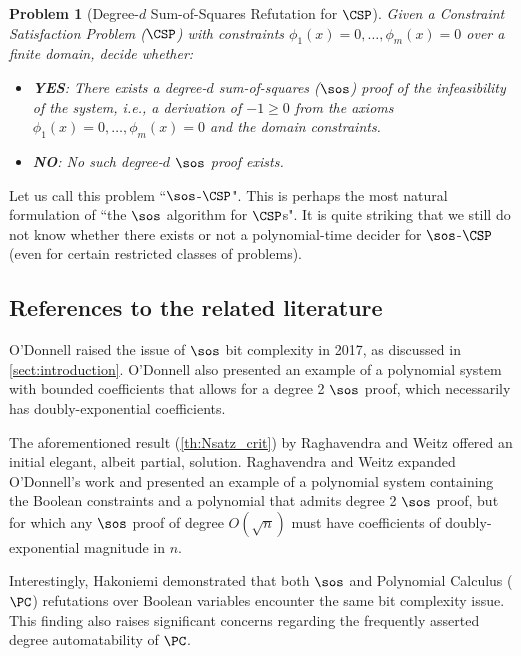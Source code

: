 \documentclass[11pt]{article}
\newtheorem{problem}[theorem]{Problem}
\begin{document}
\begin{problem}[Degree-$d$ Sum-of-Squares Refutation for $\CSP$]\label{prob:sos-csp}
Given a Constraint Satisfaction Problem (\(\CSP\)) with constraints \(\phi_1(x) = 0, \dots, \phi_m(x) = 0\) over a finite domain, decide whether:
\begin{itemize}
    \item \textbf{YES}: There exists a degree-\(d\) sum-of-squares (\(\sos\)) proof of the infeasibility of the system, i.e., a derivation of \(-1 \geq 0\) from the axioms \(\phi_1(x) = 0, \dots, \phi_m(x) = 0\) and the domain constraints.
    \item \textbf{NO}: No such degree-\(d\) \(\sos\) proof exists.
\end{itemize}
\end{problem}
%
Let us call this problem ``$\sos$-$\CSP$". This is perhaps the most natural formulation of ``the $\sos$ algorithm for $\CSP$s". 
It is quite striking that we still do not know whether there exists or not a polynomial-time decider for $\sos$-$\CSP$ (even for certain restricted classes of problems).

\subsection*{References to the related literature}\label{sect:previous_work}
O'Donnell \cite{odonnell2017} raised the issue of \(\sos\) bit complexity in 2017, as discussed in \cref{sect:introduction}. 
O'Donnell also presented an example of a polynomial system with bounded coefficients that allows for a degree 2 \(\sos\) proof, which necessarily has doubly-exponential coefficients.

The aforementioned result (\cref{th:Nsatz_crit}) by Raghavendra and Weitz \cite{raghavendra_weitz2017} offered an initial elegant, albeit partial, solution.
Raghavendra and Weitz expanded O'Donnell's work and presented an example of a polynomial system containing the Boolean constraints and a polynomial that admits degree 2 $\sos$ proof, but for which any $\sos$ proof of degree $O(\sqrt{n})$ must have coefficients of doubly-exponential magnitude in $n$.

Interestingly, Hakoniemi \cite{Hakoniemi21} demonstrated that both \(\sos\) and Polynomial Calculus ($\PC$)  refutations over Boolean variables encounter the same bit complexity issue. This finding also raises significant concerns regarding the frequently asserted degree automatability of \(\PC\).
\end{document}
